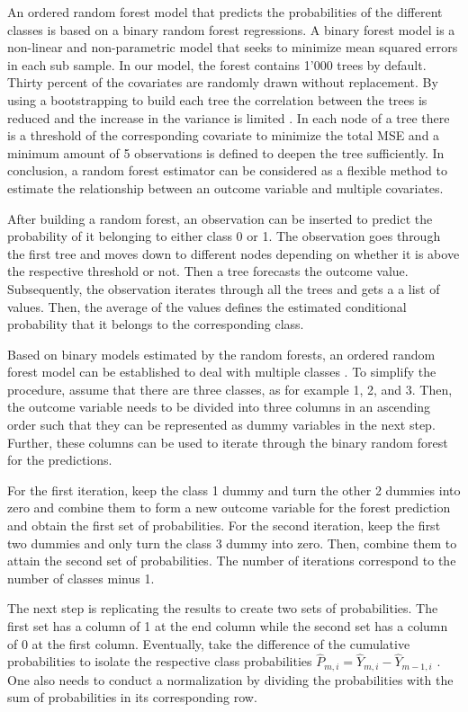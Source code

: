 \documentclass[11pt]{article}
\begin{document}
An ordered random forest model that predicts the probabilities of the different classes is based on a binary random forest regressions. A binary forest model is a non-linear and non-parametric model that seeks to minimize mean squared errors in each sub sample. In our model, the forest contains 1'000 trees by default. Thirty percent of the covariates are randomly drawn without replacement. By using a bootstrapping to build each tree the correlation between the trees is reduced and the increase in the variance is limited \cite[p.588]{hastie2009}. In each node of a tree there is a threshold of the corresponding covariate to minimize the total MSE and a minimum amount of 5 observations is defined to deepen the tree sufficiently. In conclusion, a random forest estimator can be considered as a flexible method to estimate the relationship between an outcome variable and multiple covariates.

After building a random forest, an observation can be inserted to predict the probability of it belonging to either class 0 or 1. The observation goes through the first tree and moves down to different nodes depending on whether it is above the respective threshold or not. Then a tree forecasts the outcome value. Subsequently, the observation iterates through all the trees and gets a a list of values. Then, the average of the values defines the estimated conditional probability that it belongs to the corresponding class.

Based on binary models estimated by the random forests, an ordered random forest model can be established to deal with multiple classes \cite[p.7]{lechner2019random}. To simplify the procedure, assume that there are three classes, as for example 1, 2, and 3.  Then, the outcome variable needs to be divided into three columns in an ascending order such that they can be represented as dummy variables in the next step. Further, these columns can be used to iterate through the binary random forest for the predictions.

For the first iteration, keep the class 1 dummy and turn the other 2 dummies into zero and combine them to form a new outcome variable for the forest prediction and obtain the first set of probabilities. For the second iteration,  keep the first two dummies and only turn the class 3 dummy into zero. Then, combine them to attain the second set of probabilities. The number of iterations correspond to the number of classes minus 1.

The next step is replicating the results to create two sets of probabilities. The first set has a column of 1 at the end column while the second set has a column of 0 at the first column. Eventually, take the difference of the cumulative probabilities to isolate the respective class probabilities $\hat{P}_{m,i} = \hat{Y}_{m,i} - \hat{Y}_{m-1, i}$ \cite[p.7]{lechner2019random}. One also needs to conduct a normalization by dividing the probabilities with the sum of probabilities in its corresponding row.
\end{document}
